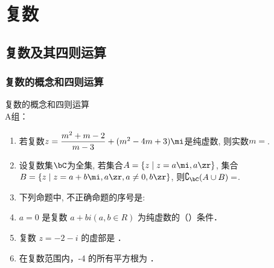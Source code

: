 \chapter{复数}

\section{复数及其四则运算}
\subsection{复数的概念和四则运算}
\zsd 复数的概念和四则运算 \\
A组：
\begin{enumerate}
    
\item 若复数$z=\dfrac{m^2+m-2}{m-3}+(m^2-4m+3)\mi$是纯虚数, 则实数$m=$. 

\item 设复数集$\bC$为全集, 若集合$A=\{z\mid z=a\mi, a\zr\}$, 集合$B=\{z\mid z=a+b\mi, a\zr, a\neq 0, b\zr\}$, 
则$\complement_{\bC}(A\cup B)=$\blkda{$\varnothing$}. 

\item 下列命题中, 不正确命题的序号是: 

\item $a=0$ 是复数 $a+b i(a, b \in R)$ 为纯虚数的（）条件．

\item 复数 $z=-2-i$ 的虚部是 ．

\item 在复数范围内，-4 的所有平方根为 ．

\end{enumerate}


